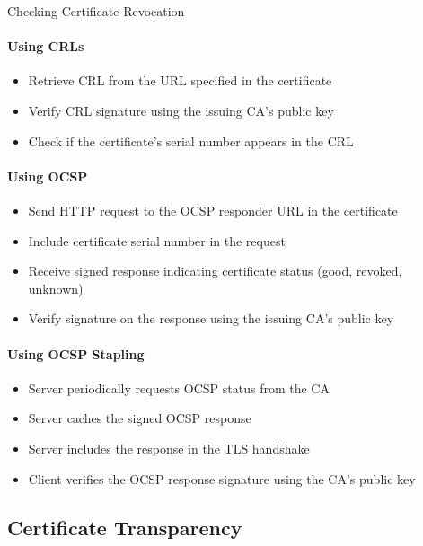 \begin{KR}{Checking Certificate Revocation}\\
\paragraph{Using CRLs}
\begin{itemize}
    \item Retrieve CRL from the URL specified in the certificate
    \item Verify CRL signature using the issuing CA's public key
    \item Check if the certificate's serial number appears in the CRL
\end{itemize}

\paragraph{Using OCSP}
\begin{itemize}
    \item Send HTTP request to the OCSP responder URL in the certificate
    \item Include certificate serial number in the request
    \item Receive signed response indicating certificate status (good, revoked, unknown)
    \item Verify signature on the response using the issuing CA's public key
\end{itemize}

\paragraph{Using OCSP Stapling}
\begin{itemize}
    \item Server periodically requests OCSP status from the CA
    \item Server caches the signed OCSP response
    \item Server includes the response in the TLS handshake
    \item Client verifies the OCSP response signature using the CA's public key
\end{itemize}
\end{KR}

\subsection{Certificate Transparency}

